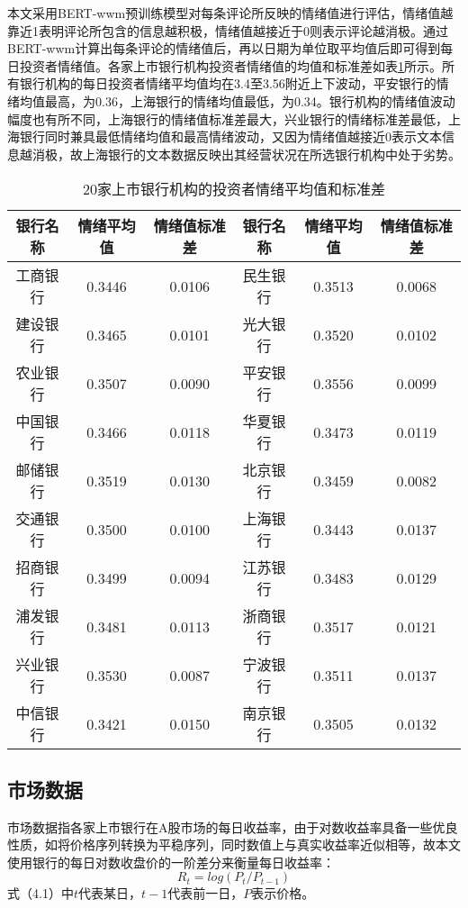 \documentclass[lang=cn]{elegantpaper}
\begin{document}
本文采用BERT-wwm预训练模型对每条评论所反映的情绪值进行评估，情绪值越靠近1表明评论所包含的信息越积极，情绪值越接近于0则表示评论越消极。通过BERT-wwm计算出每条评论的情绪值后，再以日期为单位取平均值后即可得到每日投资者情绪值。各家上市银行机构投资者情绪值的均值和标准差如表\ref{表4}所示。所有银行机构的每日投资者情绪平均值均在3.4至3.56附近上下波动，平安银行的情绪均值最高，为0.36，上海银行的情绪均值最低，为0.34。银行机构的情绪值波动幅度也有所不同，上海银行的情绪值标准差最大，兴业银行的情绪标准差最低，上海银行同时兼具最低情绪均值和最高情绪波动，又因为情绪值越接近0表示文本信息越消极，故上海银行的文本数据反映出其经营状况在所选银行机构中处于劣势。
\begin{table}[htb]
    \caption{20家上市银行机构的投资者情绪平均值和标准差}
    \label{表4}
    \begin{tabular*}{\textwidth}{@{}@{\extracolsep{\fill}}cccccc@{}}
    \toprule
    银行名称 & 情绪平均值    & 情绪值标准差   & 银行名称 & 情绪平均值    & 情绪值标准差   \\ \midrule
    工商银行 & 0.3446 & 0.0106 & 民生银行 & 0.3513 & 0.0068 \\
    建设银行 & 0.3465 & 0.0101 & 光大银行 & 0.3520 & 0.0102 \\
    农业银行 & 0.3507 & 0.0090 & 平安银行 & 0.3556 & 0.0099 \\
    中国银行 & 0.3466 & 0.0118 & 华夏银行 & 0.3473 & 0.0119 \\
    邮储银行 & 0.3519 & 0.0130 & 北京银行 & 0.3459 & 0.0082 \\
    交通银行 & 0.3500 & 0.0100 & 上海银行 & 0.3443 & 0.0137 \\
    招商银行 & 0.3499 & 0.0094 & 江苏银行 & 0.3483 & 0.0129 \\
    浦发银行 & 0.3481 & 0.0113 & 浙商银行 & 0.3517 & 0.0121 \\
    兴业银行 & 0.3530 & 0.0087 & 宁波银行 & 0.3511 & 0.0137 \\
    中信银行 & 0.3421 & 0.0150 & 南京银行 & 0.3505 & 0.0132 \\ \bottomrule
    \end{tabular*}
\end{table}

\subsection{市场数据}
市场数据指各家上市银行在A股市场的每日收益率，由于对数收益率具备一些优良性质，如将价格序列转换为平稳序列，同时数值上与真实收益率近似相等，故本文使用银行的每日对数收盘价的一阶差分来衡量每日收益率：
\begin{equation}
    R_t=log(P_t/P_{t-1})
\end{equation}
式（4.1）中$t$代表某日，$t-1$代表前一日，$P$表示价格。
\end{document}
